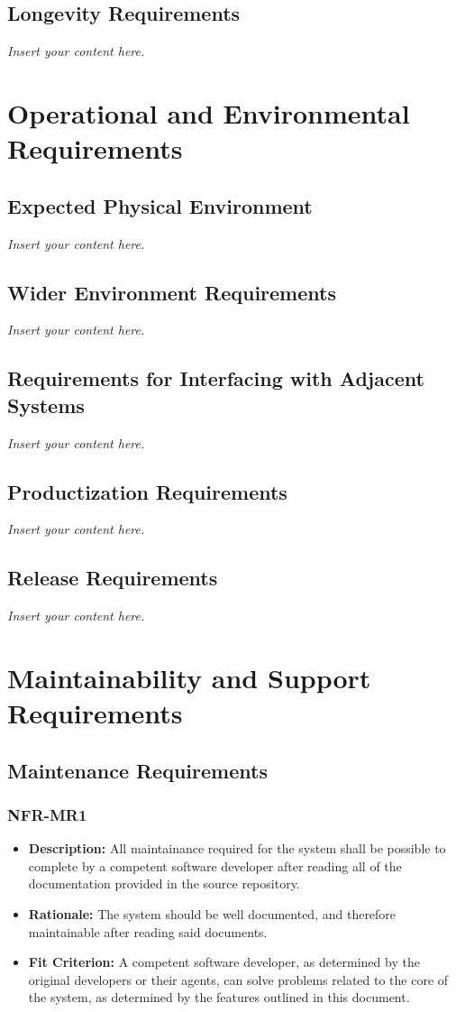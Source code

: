 \documentclass[12pt]{article}
\newcommand{\lips}{\textit{Insert your content here.}}
\begin{document}
\subsection{Longevity Requirements}
\lips

\section{Operational and Environmental Requirements}
\subsection{Expected Physical Environment}
\lips
\subsection{Wider Environment Requirements}
\lips
\subsection{Requirements for Interfacing with Adjacent Systems}
\lips
\subsection{Productization Requirements}
\lips
\subsection{Release Requirements}
\lips

\section{Maintainability and Support Requirements}
\subsection{Maintenance Requirements}
\subsubsection*{NFR-MR1}
\begin{itemize}
  \item \textbf{Description:} All maintainance required for the system shall be possible to complete by a competent software developer after reading all of the documentation provided in the source repository.
  \item \textbf{Rationale:} The system should be well documented, and therefore maintainable after reading said documents.
  \item \textbf{Fit Criterion:} A competent software developer, as determined by the original developers or their agents, can solve problems related to the core of the system, as determined by the 
  features outlined in this document.
\end{itemize}
\end{document}
